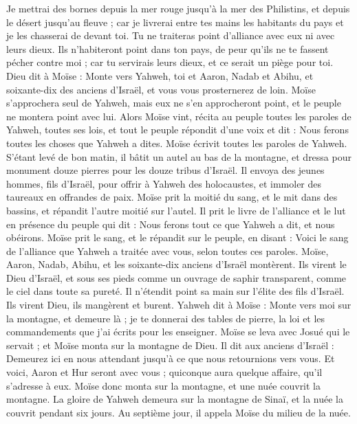 \begin{multicols}{2}
Je mettrai des bornes depuis la mer rouge jusqu'à la mer des Philistins, et depuis le désert jusqu'au fleuve ; car je livrerai entre tes mains les habitants du pays et je les chasserai de devant toi.
Tu ne traiteras point d'alliance avec eux ni avec leurs dieux.
Ils n'habiteront point dans ton pays, de peur qu'ils ne te fassent pécher contre moi ; car tu servirais leurs dieux, et ce serait un piège pour toi.
\VerseOne{}Dieu dit à Moïse : Monte vers Yahweh, toi et Aaron, Nadab et Abihu, et soixante-dix des anciens d'Israël, et vous vous prosternerez de loin.
Moïse s'approchera seul de Yahweh, mais eux ne s'en approcheront point, et le peuple ne montera point avec lui.
Alors Moïse vint, récita au peuple toutes les paroles de Yahweh, toutes ses lois, et tout le peuple répondit d'une voix et dit : Nous ferons toutes les choses que Yahweh a dites.
Moïse écrivit toutes les paroles de Yahweh. S'étant levé de bon matin, il bâtit un autel au bas de la montagne, et dressa pour monument douze pierres pour les douze tribus d'Israël.
Il envoya des jeunes hommes, fils d'Israël, pour offrir à Yahweh des holocaustes, et immoler des taureaux en offrandes de paix.
Moïse prit la moitié du sang, et le mit dans des bassins, et répandit l'autre moitié sur l'autel.
Il prit le livre de l'alliance et le lut en présence du peuple qui dit : Nous ferons tout ce que Yahweh a dit, et nous obéirons.
Moïse prit le sang, et le répandit sur le peuple, en disant : Voici le sang de l'alliance que Yahweh a traitée avec vous, selon toutes ces paroles.
Moïse, Aaron, Nadab, Abihu, et les soixante-dix anciens d'Israël montèrent.
Ils virent le Dieu d'Israël, et sous ses pieds comme un ouvrage de saphir transparent, comme le ciel dans toute sa pureté.
Il n’étendit point sa main sur l’élite des fils d'Israël. Ils virent Dieu, ils mangèrent et burent.
Yahweh dit à Moïse : Monte vers moi sur la montagne, et demeure là ; je te donnerai des tables de pierre, la loi et les commandements que j'ai écrits pour les enseigner.
Moïse se leva avec Josué qui le servait ; et Moïse monta sur la montagne de Dieu.
Il dit aux anciens d'Israël : Demeurez ici en nous attendant jusqu'à ce que nous retournions vers vous. Et voici, Aaron et Hur seront avec vous ; quiconque aura quelque affaire, qu'il s'adresse à eux.
Moïse donc monta sur la montagne, et une nuée couvrit la montagne.
La gloire de Yahweh demeura sur la montagne de Sinaï, et la nuée la couvrit pendant six jours. Au septième jour, il appela Moïse du milieu de la nuée.

\end{multicols}
